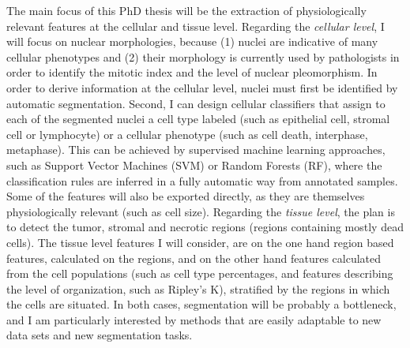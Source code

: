 \documentclass[a4paper,10pt,twocolumn]{article}
\begin{document}
The main focus of this PhD thesis will be the extraction of
physiologically relevant features at the cellular and tissue
level. Regarding the {\em cellular level}, I will focus on nuclear morphologies,
because (1) nuclei are indicative of many cellular
phenotypes\citep{Chow2012} and (2) their morphology is currently used by
pathologists in order to identify the mitotic index and the level of
nuclear pleomorphism\citep{Elston1991}. In order to derive information
at the cellular level, nuclei must first be identified by automatic
segmentation. Second, I can design cellular classifiers that assign
to each of the segmented nuclei a cell type labeled (such as
epithelial cell, stromal cell or 
lymphocyte) or a cellular phenotype (such as cell death, interphase,
metaphase). This can be achieved by supervised machine learning approaches,
such as Support Vector Machines (SVM) or Random Forests (RF), 
where the classification rules are inferred in a fully automatic way from
annotated samples. Some of the features will also be exported directly, as they
are themselves physiologically relevant (such as cell size). 
Regarding the {\em tissue level}, the plan is to detect the tumor,
stromal and necrotic regions (regions containing mostly dead
cells). The tissue level features I will consider, are on the one hand
region based features, calculated on the regions, and on the other
hand features calculated from the cell populations (such as cell type
percentages, and features describing the level of organization, such
as Ripley's K), stratified by the regions in which the cells are situated. 
In both cases, segmentation will be probably a bottleneck, and I am
particularly interested by methods that are easily adaptable to new
data sets and new segmentation tasks.

%
\end{document}
